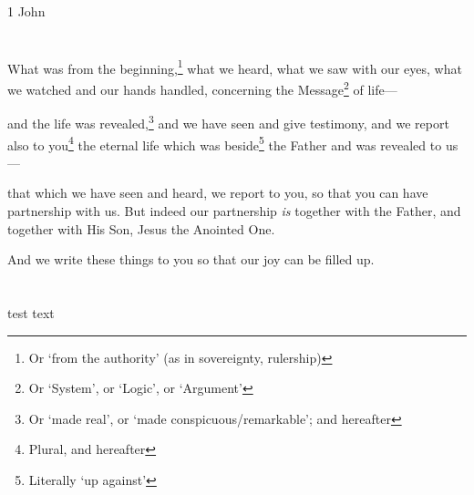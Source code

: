 \documentclass[article]{memoir}%
\newcounter{vnum}
\newcommand{\vnum}{%
	\textsuperscript{\thevnum}%
	\addtocounter{vnum}{1}%
}
\newcommand{\infer}[1]{\textit{#1}}
\renewcommand*{\book}[1]{#1}
\begin{document}
	
\book{1 John}
	
\chapter{} \vnum What was from the beginning,\footnote{Or ‘from the authority’ (as in sovereignty, rulership)} what we heard, what we saw with our eyes, what we watched and our hands handled, concerning the Message\footnote{Or ‘System’, or ‘Logic’, or ‘Argument’} of life---\vnum and the life was revealed,\footnote{Or `made real', or `made conspicuous/remarkable'; and hereafter} and we have seen and give testimony, and we report also to you\footnote{Plural, and hereafter} the eternal life which was beside\footnote{Literally ‘up against’} the Father and was revealed to us---\vnum that which we have seen and heard, we report to you, so that you can have partnership with us. But indeed our partnership \infer{is} together with the Father, and together with His Son, Jesus the Anointed One. \vnum And we write these things to you so that our joy can be filled up.

\chapter{} test text
\end{document}
